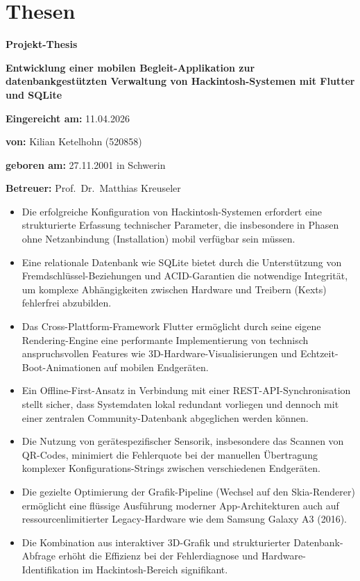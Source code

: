 \section*{Thesen}

\textbf{Projekt-Thesis}

\textbf{Entwicklung einer mobilen Begleit-Applikation zur datenbankgestützten Verwaltung von Hackintosh-Systemen mit Flutter und SQLite}

\vspace{0.5cm}

\textbf{Eingereicht am:} 11.04.2026

\textbf{von:} Kilian Ketelhohn (520858)

\textbf{geboren am:} 27.11.2001 in Schwerin

\textbf{Betreuer:} Prof.\ Dr.\ Matthias Kreuseler

\vspace{1cm}

\begin{itemize}

\item Die erfolgreiche Konfiguration von Hackintosh-Systemen erfordert eine strukturierte Erfassung technischer Parameter, die insbesondere in Phasen ohne Netzanbindung (Installation) mobil verfügbar sein müssen.

\item Eine relationale Datenbank wie SQLite bietet durch die Unterstützung von Fremdschlüssel-Beziehungen und ACID-Garantien die notwendige Integrität, um komplexe Abhängigkeiten zwischen Hardware und Treibern (Kexts) fehlerfrei abzubilden.

\item Das Cross-Plattform-Framework Flutter ermöglicht durch seine eigene Rendering-Engine eine performante Implementierung von technisch anspruchsvollen Features wie 3D-Hardware-Visualisierungen und Echtzeit-Boot-Animationen auf mobilen Endgeräten.

\item Ein Offline-First-Ansatz in Verbindung mit einer REST-API-Synchronisation stellt sicher, dass Systemdaten lokal redundant vorliegen und dennoch mit einer zentralen Community-Datenbank abgeglichen werden können.

\item Die Nutzung von gerätespezifischer Sensorik, insbesondere das Scannen von QR-Codes, minimiert die Fehlerquote bei der manuellen Übertragung komplexer Konfigurations-Strings zwischen verschiedenen Endgeräten.

\item Die gezielte Optimierung der Grafik-Pipeline (Wechsel auf den Skia-Renderer) ermöglicht eine flüssige Ausführung moderner App-Architekturen auch auf ressourcenlimitierter Legacy-Hardware wie dem Samsung Galaxy A3 (2016).

\item Die Kombination aus interaktiver 3D-Grafik und strukturierter Datenbank-Abfrage erhöht die Effizienz bei der Fehlerdiagnose und Hardware-Identifikation im Hackintosh-Bereich signifikant.

\end{itemize}